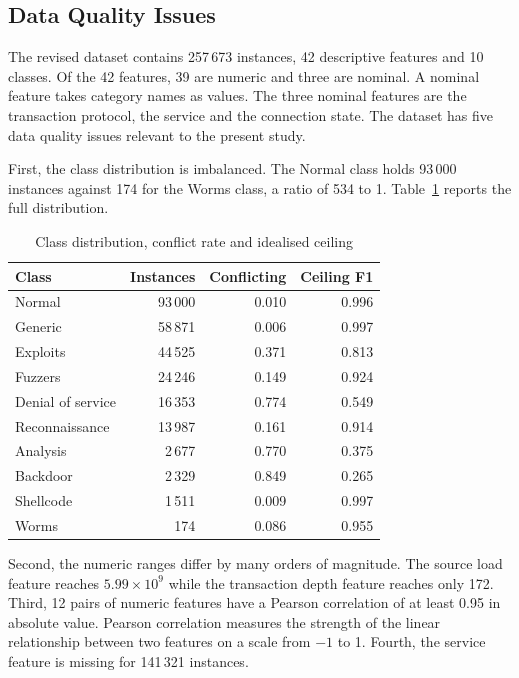 \documentclass[conference]{IEEEtran}
\begin{document}
\subsection{Data Quality Issues}

The revised dataset contains 257\,673 instances, 42 descriptive features and 10
classes. Of the 42 features, 39 are numeric and three are nominal. A nominal
feature takes category names as values. The three nominal features are the
transaction protocol, the service and the connection state. The dataset has five
data quality issues relevant to the present study.

First, the class distribution is imbalanced. The Normal class holds 93\,000
instances against 174 for the Worms class, a ratio of 534 to 1.
Table~\ref{tab:classes} reports the full distribution.

\begin{table}[t]
\centering
\caption{Class distribution, conflict rate and idealised ceiling}
\label{tab:classes}
\small
\begin{tabular}{lrrr}
\toprule
Class & Instances & Conflicting & Ceiling F1 \\
\midrule
Normal & 93\,000 & 0.010 & 0.996 \\
Generic & 58\,871 & 0.006 & 0.997 \\
Exploits & 44\,525 & 0.371 & 0.813 \\
Fuzzers & 24\,246 & 0.149 & 0.924 \\
Denial of service & 16\,353 & 0.774 & 0.549 \\
Reconnaissance & 13\,987 & 0.161 & 0.914 \\
Analysis & 2\,677 & 0.770 & 0.375 \\
Backdoor & 2\,329 & 0.849 & 0.265 \\
Shellcode & 1\,511 & 0.009 & 0.997 \\
Worms & 174 & 0.086 & 0.955 \\
\bottomrule
\end{tabular}
\end{table}

Second, the numeric ranges differ by many orders of magnitude. The source load
feature reaches $5.99 \times 10^{9}$ while the transaction depth feature reaches
only 172. Third, 12 pairs of numeric features have a Pearson correlation of at least
0.95 in absolute value. Pearson correlation measures the strength of the linear
relationship between two features on a scale from $-1$ to 1. Fourth, the service
feature is missing for 141\,321 instances.
\end{document}
